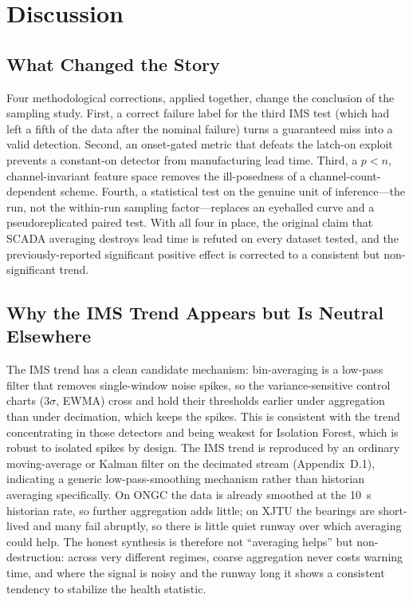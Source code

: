 \documentclass[IJPHM, 2026, 0]{PHMSociety}
\begin{document}
\FloatBarrier
\section{Discussion}

\subsection{What Changed the Story}
Four methodological corrections, applied together, change the conclusion of the sampling study. First, a correct failure label for the third IMS test (which had left a fifth of the data after the nominal failure) turns a guaranteed miss into a valid detection. Second, an onset-gated metric that defeats the latch-on exploit prevents a constant-on detector from manufacturing lead time. Third, a $p < n$, channel-invariant feature space removes the ill-posedness of a channel-count-dependent scheme. Fourth, a statistical test on the genuine unit of inference---the run, not the within-run sampling factor---replaces an eyeballed curve and a pseudoreplicated paired test. With all four in place, the original claim that SCADA averaging destroys lead time is refuted on every dataset tested, and the previously-reported significant positive effect is corrected to a consistent but non-significant trend.

\subsection{Why the IMS Trend Appears but Is Neutral Elsewhere}
The IMS trend has a clean candidate mechanism: bin-averaging is a low-pass filter that removes single-window noise spikes, so the variance-sensitive control charts ($3\sigma$, EWMA) cross and hold their thresholds earlier under aggregation than under decimation, which keeps the spikes. This is consistent with the trend concentrating in those detectors and being weakest for Isolation Forest, which is robust to isolated spikes by design. The IMS trend is reproduced by an ordinary moving-average or Kalman filter on the decimated stream (Appendix~D.1), indicating a generic low-pass-smoothing mechanism rather than historian averaging specifically. On ONGC the data is already smoothed at the 10~s historian rate, so further aggregation adds little; on XJTU the bearings are short-lived and many fail abruptly, so there is little quiet runway over which averaging could help. The honest synthesis is therefore not ``averaging helps'' but non-destruction: across very different regimes, coarse aggregation never costs warning time, and where the signal is noisy and the runway long it shows a consistent tendency to stabilize the health statistic.
\end{document}
